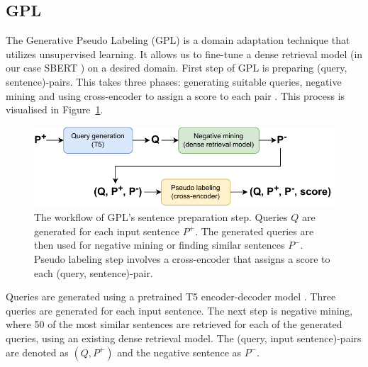 \documentclass[fleqn,moreauthors,10pt]{ds_report}
\begin{document}


\subsection*{GPL}

The Generative Pseudo Labeling (GPL) is a domain adaptation technique that utilizes unsupervised learning. It allows us to fine-tune a dense retrieval model (in our case SBERT \cite{SBERT}) on a desired domain. First step of GPL is preparing (query, sentence)-pairs. This takes three phases: generating suitable queries, negative mining and using cross-encoder to assign a score to each pair \cite{GPL}. This process is visualised in Figure~\ref{fig:GPL}.

\begin{figure}[ht]\centering
	\vspace{12 pt}
	\includegraphics[width=\linewidth]{GPL_data_preprocessing.pdf}
	\vspace{5 pt}
	\caption{The workflow of GPL's sentence preparation step. Queries $Q$ are generated for each input sentence $P^{+}$. The generated queries are then used for negative mining or finding similar sentences $P^{-}$. Pseudo labeling step involves a cross-encoder that assigns a score to each (query, sentence)-pair.}
	\label{fig:GPL}
\end{figure}

Queries are generated using a pretrained T5 encoder-decoder model \cite{T5}. Three queries are generated for each input sentence. The next step is negative mining, where 50 of the most similar sentences are retrieved for each of the generated queries, using an existing dense retrieval model. The (query, input sentence)-pairs are denoted as $(Q, P^{+})$ and the negative sentence as $P^{-}$.
\end{document}
